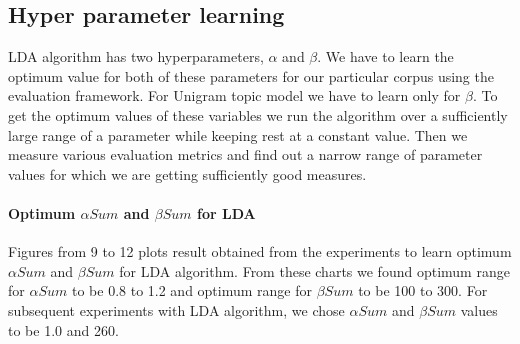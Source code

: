 \subsection{Hyper parameter learning} LDA algorithm has two hyperparameters, $ \alpha$ and $ \beta$. We have to learn the optimum value for both of these parameters for our particular corpus using the evaluation framework. For Unigram topic model we have to learn only for $\beta$. To get the optimum values of these variables we run the algorithm over a sufficiently large range of a parameter while keeping rest at a constant value. Then we measure various evaluation metrics and find out a narrow range of parameter values for which we are getting sufficiently good measures. 
\paragraph{Optimum $\alpha Sum$ and $\beta Sum$ for LDA}Figures from 9 to 12 plots result obtained from the experiments to learn optimum $\alpha Sum$ and $\beta Sum$ for LDA algorithm. From these charts we found optimum range for $\alpha Sum$ to be 0.8 to 1.2 and optimum range for $\beta Sum$ to be 100 to 300. For subsequent experiments with LDA algorithm, we chose $\alpha Sum$ and $\beta Sum$ values to be 1.0 and 260.

